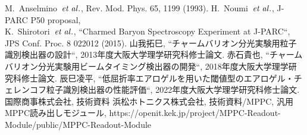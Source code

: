 \begin{thebibliography}{99}
   M.~Anselmino~${\it et\;al.}$, Rev. Mod. Phys. 65, 1199 (1993).
   H.~Noumi~${\it et\;al.}$, J-PARC P50 proposal, \\
   K.~Shirotori~${\it et\;al.}$, ``Charmed Baryon Spectroscopy Experiment at J-PARC``, JPS Conf. Proc. 8 022012 (2015).
   山我拓巳, ``チャームバリオン分光実験用粒子識別検出器の設計``, 2013年度大阪大学理学研究科修士論文.
   赤石貴也, ``チャームバリオン分光実験用ビームタイミング検出器の開発``, 2018年度大阪大学理学研究科修士論文.
   辰巳凌平, ``低屈折率エアロゲルを用いた閾値型のエアロゲル・チェレンコフ粒子識別検出器の性能評価``, 2022年度大阪大学理学研究科修士論文.
   国際商事株式会社, 技術資料
   浜松ホトニクス株式会社, 技術資料/MPPC,
   汎用MPPC読み出しモジュール, https://openit.kek.jp/project/MPPC-Readout-Module/public/MPPC-Readout-Module








\end{thebibliography}
